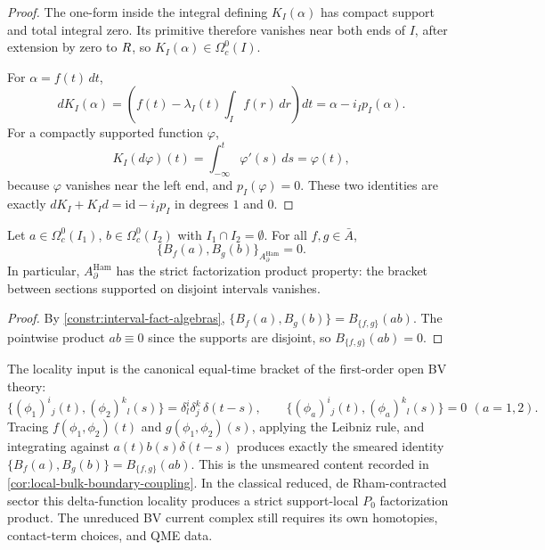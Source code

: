 \documentclass[11pt]{memoir}
\begin{document}
\begin{proof}
  The one-form inside the integral defining \(K_I(\alpha)\) has compact
  support and total integral zero. Its primitive therefore vanishes near
  both ends of \(I\), after extension by zero to \(R\), so
  \(K_I(\alpha)\in\Omega^0_c(I)\).

  For \(\alpha=f(t)\,dt\),
  \[
    dK_I(\alpha)
      =
      \left(f(t)-\lambda_I(t)\int_I f(r)\,dr\right)dt
      =
      \alpha-i_Ip_I(\alpha).
  \]
  For a compactly supported function \(\varphi\),
  \[
    K_I(d\varphi)(t)=\int_{-\infty}^{t}\varphi'(s)\,ds=\varphi(t),
  \]
  because \(\varphi\) vanishes near the left end, and \(p_I(\varphi)=0\).
  These two identities are exactly
  \(dK_I+K_I d=\mathrm{id}-i_Ip_I\) in degrees \(1\) and \(0\).
\end{proof}

\begin{prop}\label{prop:brane-bracket-locality}
  Let $a\in\Omega^0_c(I_1)$, $b\in\Omega^0_c(I_2)$ with
  $I_1\cap I_2=\emptyset$. For all $f,g\in\bar A$,
  $$\{B_f(a),B_g(b)\}_{A_\partial^{\mathrm{Ham}}}=0.$$
  In particular, $A_\partial^{\mathrm{Ham}}$ has the strict
  factorization product property: the bracket between sections
  supported on disjoint intervals vanishes.
\end{prop}

\begin{proof}
  By \ref{constr:interval-fact-algebras},
  $\{B_f(a),B_g(b)\}=B_{\{f,g\}}(ab)$. The pointwise product
  $ab\equiv 0$ since the supports are disjoint, so
  $B_{\{f,g\}}(ab)=0$.
\end{proof}

\begin{rmk}\label{rmk:equal-time-locality}
  The locality input is the canonical equal-time bracket of the
  first-order open BV theory:
  $$\{(\phi_1)^i{}_j(t),(\phi_2)^k{}_l(s)\}
    =\delta^i_l\delta^k_j\,\delta(t-s),\qquad
    \{(\phi_a)^i{}_j(t),(\phi_a)^k{}_l(s)\}=0\ \,(a=1,2).$$
  Tracing $f(\phi_1,\phi_2)(t)$ and $g(\phi_1,\phi_2)(s)$, applying the
  Leibniz rule, and integrating against $a(t)b(s)\delta(t-s)$ produces
  exactly the smeared identity
  $\{B_f(a),B_g(b)\}=B_{\{f,g\}}(ab)$. This is the unsmeared content
  recorded in \ref{cor:local-bulk-boundary-coupling}.  In the classical
  reduced, de Rham-contracted sector this delta-function locality
  produces a strict support-local \(P_0\) factorization product.  The
  unreduced BV current complex still requires its own homotopies,
  contact-term choices, and QME data.
\end{rmk}
\end{document}
